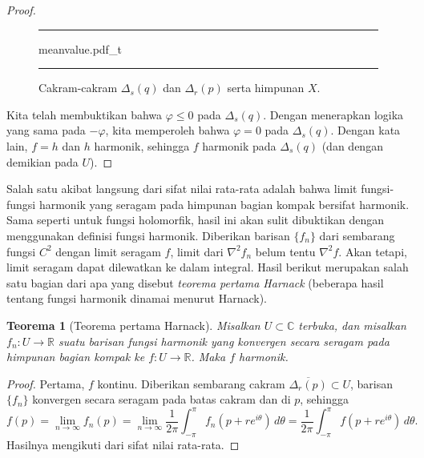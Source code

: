 \documentclass[12pt,openany]{book}
\newcommand{\C}{{\mathbb{C}}}
\newcommand{\R}{{\mathbb{R}}}
\newcommand{\myindex}[1]{#1\index{#1}}
\theoremstyle{plain}
\newtheorem{thm}{Teorema}[section]
\theoremstyle{remark}
\theoremstyle{definition}
\newenvironment{myfig}{%
\begin{figure}[h!t]
\noindent\rule{\textwidth}{0.5pt}\vspace{12pt}\par\centering}%
{\par\noindent\rule{\textwidth}{0.5pt}
\end{figure}}
\theoremstyle{exercise}
\theoremstyle{example}
\begin{document}
\begin{proof}
\begin{myfig}
{meanvalue.pdf_t}
\caption{Cakram-cakram $\Delta_s(q)$ dan $\Delta_r(p)$ serta himpunan
$X$.\label{fig:meanvalue}}
\end{myfig}

Kita telah membuktikan bahwa $\varphi \leq 0$ pada $\Delta_s(q)$. Dengan menerapkan
logika yang sama pada $-\varphi$, kita memperoleh bahwa $\varphi = 0$ pada $\Delta_s(q)$.
Dengan kata lain, $f=h$ dan $h$ harmonik, sehingga $f$ harmonik pada
$\Delta_s(q)$ (dan dengan demikian pada $U$).
\end{proof}

Salah satu akibat langsung dari sifat nilai rata-rata adalah bahwa limit
fungsi-fungsi harmonik yang seragam pada himpunan bagian kompak bersifat harmonik.  Sama seperti untuk
fungsi holomorfik, hasil ini akan sulit dibuktikan dengan menggunakan definisi
fungsi harmonik.  Diberikan barisan $\{ f_n \}$ dari sembarang fungsi $C^2$
dengan limit seragam $f$,
limit dari $\nabla^2 f_n$ belum tentu
$\nabla^2 f$.  Akan tetapi,
limit seragam dapat dilewatkan ke dalam integral.  Hasil berikut merupakan salah satu bagian
dari apa yang disebut \emph{\myindex{teorema pertama Harnack}} (beberapa
hasil tentang fungsi harmonik dinamai menurut Harnack).

\begin{thm}[Teorema pertama Harnack]\label{thm:harnack1}
Misalkan $U \subset \C$ terbuka, dan misalkan $f_n \colon U \to \R$ suatu barisan
fungsi harmonik yang konvergen secara seragam pada himpunan bagian kompak ke $f \colon U
\to \R$.  Maka $f$ harmonik.
\end{thm}

\begin{proof}
Pertama, $f$ kontinu.
Diberikan sembarang cakram $\overline{\Delta_r(p)} \subset U$,
barisan $\{ f_n \}$ konvergen secara seragam pada batas cakram
dan di $p$, sehingga
\begin{equation*}
f(p) =
\lim_{n\to\infty} f_n(p)
=
\lim_{n\to\infty} 
\frac{1}{2\pi} \int_{-\pi}^{\pi} f_n(p+re^{i\theta})\, d\theta
=
\frac{1}{2\pi} \int_{-\pi}^{\pi} f(p+re^{i\theta})\, d\theta .
\end{equation*}
Hasilnya mengikuti dari sifat nilai rata-rata.
\end{proof}
\end{document}
